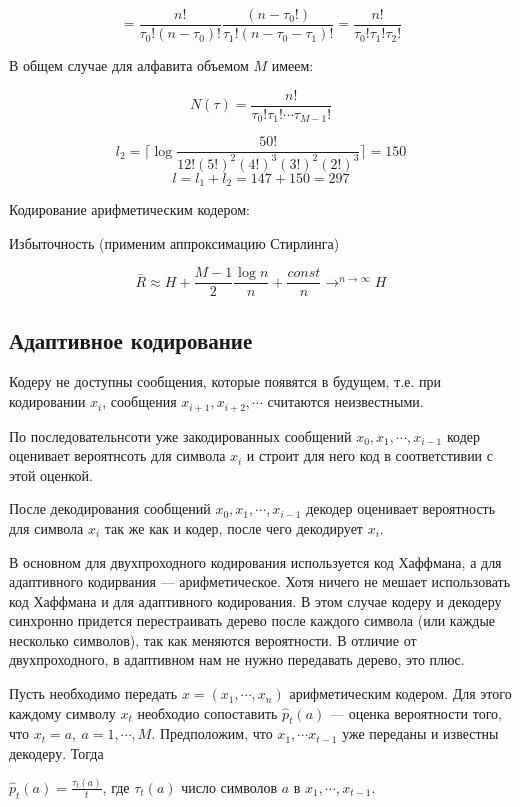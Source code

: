 {\[
    = \frac{n!}{\tau_0!(n - \tau_0)!} \frac{(n - \tau_0!)}{\tau_1!(n - \tau_0 -
    \tau_1)!} = \frac{n!}{\tau_0! \tau_1! \tau_2!}
\]

В общем случае для алфавита объемом $M$ имеем:

\[
    N(\tau) = \frac{n!}{\tau_0! \tau_1! \cdots \tau_{M-1}!}
\]

\[
    l_2 = \lceil \log \frac{50!}{12! (5!)^2 (4!)^3 (3!)^2 (2!)^3} \rceil = 150
\]
\[
    l = l_1 + l_2 = 147 + 150 = 297
\]

Кодирование арифметическим кодером:


Избыточность (применим аппроксимацию Стирлинга)

\[
    \bar R \approx H + \frac{M - 1}{2} \frac{\log n}{n } + \frac{const}{n}
    \to^{n\to \infty} H
\]

\subsection{Адаптивное кодирование}

Кодеру не доступны сообщения, которые появятся в будущем, т.е. при кодировании
$x_i$, сообщения $x_{i+1}, x_{i+2}, \cdots$ считаются неизвестными.

По последовательнсоти уже закодированных сообщений $x_0, x_1, \cdots, x_{i-1}$
кодер оценивает вероятнсоть для символа $x_i$ и строит для него код в
соответстивии с этой оценкой.

После декодирования сообщений $x_0, x_1, \cdots, x_{i-1}$ декодер оценивает
вероятность для символа $x_i$ так же как и кодер, после чего декодирует $x_i$.

В основном для двухпроходного кодирования используется код Хаффмана, а для
адаптивного кодирвания --- арифметическое. Хотя ничего не мешает использовать
код Хаффмана и для адаптивного кодирования. В этом случае кодеру и декодеру
синхронно придется перестраивать дерево после каждого символа (или каждые
несколько символов), так как меняются вероятности. В отличие от двухпроходного,
в адаптивном нам не нужно передавать дерево, это плюс.

Пусть необходимо передать $x = (x_1, \cdots, x_n)$ арифметическим кодером. Для
этого каждому символу $x_t$ необходио сопоставить $\hat p_t(a)$ --- оценка
вероятности того, что $x_t = a,\ a = 1, \cdots, M$. Предположим, что $x_1,
\cdots x_{t-1}$ уже переданы и известны декодеру. Тогда

$\hat p_t(a) = \frac{\tau_t(a)}{t}$, где $\tau_t(a)$ число символов $a$ в $x_1,
\cdots, x_{t-1}$.

}
